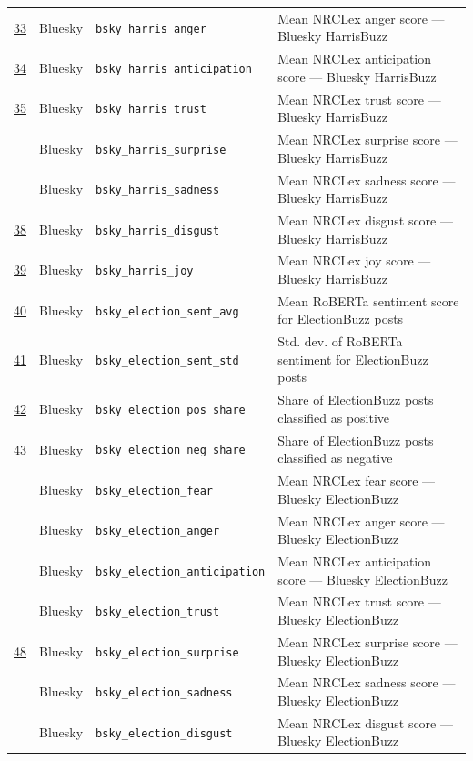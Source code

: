 \begin{longtable}{>{\centering\arraybackslash}p{0.9cm} p{2cm} p{4cm} p{7.5cm}}
\underline{33} & Bluesky & \texttt{bsky\_harris\_anger} & Mean NRCLex anger score --- Bluesky HarrisBuzz \\
\underline{34} & Bluesky & \texttt{bsky\_harris\_anticipation} & Mean NRCLex anticipation score --- Bluesky HarrisBuzz \\
\underline{35} & Bluesky & \texttt{bsky\_harris\_trust} & Mean NRCLex trust score --- Bluesky HarrisBuzz \\
36 & Bluesky & \texttt{bsky\_harris\_surprise} & Mean NRCLex surprise score --- Bluesky HarrisBuzz \\
37 & Bluesky & \texttt{bsky\_harris\_sadness} & Mean NRCLex sadness score --- Bluesky HarrisBuzz \\
\underline{38} & Bluesky & \texttt{bsky\_harris\_disgust} & Mean NRCLex disgust score --- Bluesky HarrisBuzz \\
\underline{39} & Bluesky & \texttt{bsky\_harris\_joy} & Mean NRCLex joy score --- Bluesky HarrisBuzz \\
\underline{40} & Bluesky & \texttt{bsky\_election\_sent\_avg} & Mean RoBERTa sentiment score for ElectionBuzz posts \\
\underline{41} & Bluesky & \texttt{bsky\_election\_sent\_std} & Std. dev. of RoBERTa sentiment for ElectionBuzz posts \\
\underline{42} & Bluesky & \texttt{bsky\_election\_pos\_share} & Share of ElectionBuzz posts classified as positive \\
\underline{43} & Bluesky & \texttt{bsky\_election\_neg\_share} & Share of ElectionBuzz posts classified as negative \\
44 & Bluesky & \texttt{bsky\_election\_fear} & Mean NRCLex fear score --- Bluesky ElectionBuzz \\
45 & Bluesky & \texttt{bsky\_election\_anger} & Mean NRCLex anger score --- Bluesky ElectionBuzz \\
46 & Bluesky & \texttt{bsky\_election\_anticipation} & Mean NRCLex anticipation score --- Bluesky ElectionBuzz \\
47 & Bluesky & \texttt{bsky\_election\_trust} & Mean NRCLex trust score --- Bluesky ElectionBuzz \\
\underline{48} & Bluesky & \texttt{bsky\_election\_surprise} & Mean NRCLex surprise score --- Bluesky ElectionBuzz \\
49 & Bluesky & \texttt{bsky\_election\_sadness} & Mean NRCLex sadness score --- Bluesky ElectionBuzz \\
50 & Bluesky & \texttt{bsky\_election\_disgust} & Mean NRCLex disgust score --- Bluesky ElectionBuzz \\

\end{longtable}
